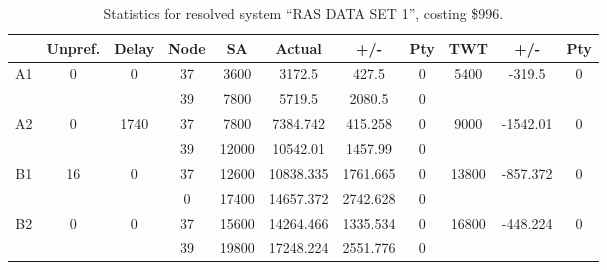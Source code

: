 \begin{sidewaystable}
\centering
\footnotesize
\caption{Statistics for resolved system ``RAS DATA SET 1'', costing \$996.}
\begin{tabular}{c||c|c||c|c|c|c|c||c|c|c}
  \hline \hline
  &
  Unpref. & 
  Delay &
  Node &
  SA &
  Actual &
  +/- &
  Pty &
  TWT &
  +/- &
  Pty \\
      \hline
      \multirow{2}{*}{A1} &
      \multirow{2}{*}{0} &
      \multirow{2}{*}{0} &
      37 &
      3600 &
        3172.5 &
        427.5 &
        0 &
      \multirow{2}{*}{5400} &
        \multirow{2}{*}{-319.5} &
        \multirow{2}{*}{0}
      \\
      \cline{4-8}
       &
       &
       &
      39 &
      7800 &
        5719.5 &
        2080.5 &
        0 &
      
         &
        
      \\
      \hline
      \multirow{2}{*}{A2} &
      \multirow{2}{*}{0} &
      \multirow{2}{*}{1740} &
      37 &
      7800 &
        7384.742 &
        415.258 &
        0 &
      \multirow{2}{*}{9000} &
        \multirow{2}{*}{-1542.01} &
        \multirow{2}{*}{0}
      \\
      \cline{4-8}
       &
       &
       &
      39 &
      12000 &
        10542.01 &
        1457.99 &
        0 &
      
         &
        
      \\
      \hline
      \multirow{2}{*}{B1} &
      \multirow{2}{*}{16} &
      \multirow{2}{*}{0} &
      37 &
      12600 &
        10838.335 &
        1761.665 &
        0 &
      \multirow{2}{*}{13800} &
        \multirow{2}{*}{-857.372} &
        \multirow{2}{*}{0}
      \\
      \cline{4-8}
       &
       &
       &
      0 &
      17400 &
        14657.372 &
        2742.628 &
        0 &
      
         &
        
      \\
      \hline
      \multirow{2}{*}{B2} &
      \multirow{2}{*}{0} &
      \multirow{2}{*}{0} &
      37 &
      15600 &
        14264.466 &
        1335.534 &
        0 &
      \multirow{2}{*}{16800} &
        \multirow{2}{*}{-448.224} &
        \multirow{2}{*}{0}
      \\
      \cline{4-8}
       &
       &
       &
      39 &
      19800 &
        17248.224 &
        2551.776 &
        0 &
      

\end{tabular}
\end{sidewaystable}
